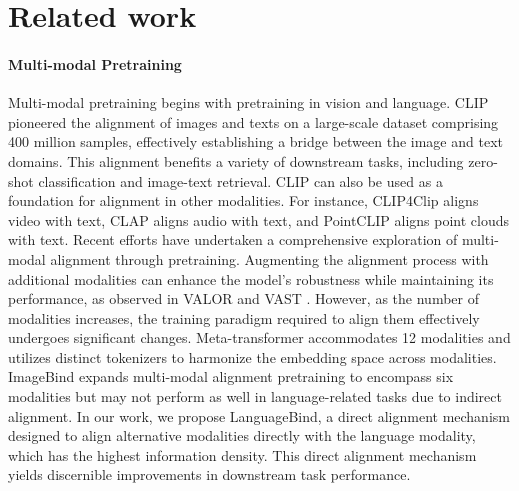 \documentclass{article} \usepackage{iclr2024_conference,times}
\begin{document}
\section{Related work}

\paragraph{Multi-modal Pretraining}
Multi-modal pretraining begins with pretraining in vision and language. CLIP~\citep{radford2021learning} pioneered the alignment of images and texts on a large-scale dataset comprising 400 million samples, effectively establishing a bridge between the image and text domains. This alignment benefits a variety of downstream tasks, including zero-shot classification and image-text retrieval. CLIP can also be used as a foundation for alignment in other modalities.  For instance, CLIP4Clip \citep{luo2022clip4clip} aligns video with text, CLAP \citep{laionclap2023} aligns audio with text, and PointCLIP \citep{zhang2022pointclip} aligns point clouds with text.
Recent efforts have undertaken a comprehensive exploration of multi-modal alignment through pretraining. Augmenting the alignment process with additional modalities can enhance the model's robustness while maintaining its performance, as observed in VALOR \citep{chen2023valor} and VAST \citep{chen2023vast}. However, as the number of modalities increases, the training paradigm required to align them effectively undergoes significant changes. Meta-transformer \citep{zhang2023meta} accommodates 12 modalities and utilizes distinct tokenizers to harmonize the embedding space across modalities. ImageBind \citep{girdhar2023imagebind} expands multi-modal alignment pretraining to encompass six modalities but may not perform as well in language-related tasks due to indirect alignment. In our work, we propose LanguageBind, a direct alignment mechanism designed to align alternative modalities directly with the language modality, which has the highest information density. This direct alignment mechanism yields discernible improvements in downstream task performance.
\end{document}
